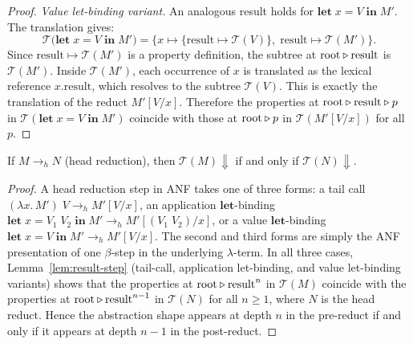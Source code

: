 \begin{proof}
  \medskip\noindent
  \emph{Value let-binding variant.}
  An analogous result holds for
  $\mathbf{let}\; x = V \;\mathbf{in}\; M'$.
  The translation gives:
  \[
    \mathcal{T}\bigl(\mathbf{let}\; x = V \;\mathbf{in}\; M'\bigr) =
    \{x \mapsto \{\mathrm{result} \mapsto \mathcal{T}(V)\},\;
    \mathrm{result} \mapsto \mathcal{T}(M')\}.
  \]
  Since $\mathrm{result} \mapsto \mathcal{T}(M')$ is a property
  definition, the subtree at
  $\text{root} \mathbin{\triangleright} \mathrm{result}$ is $\mathcal{T}(M')$.
  Inside $\mathcal{T}(M')$, each occurrence of $x$ is translated
  as the lexical reference $x.\mathrm{result}$, which resolves to
  the subtree $\mathcal{T}(V)$.
  This is exactly the translation of the reduct
  $M'[V/x]$.
  Therefore the properties at
  $\text{root} \mathbin{\triangleright} \mathrm{result} \mathbin{\triangleright} p$ in
  $\mathcal{T}(\mathbf{let}\; x = V \;\mathbf{in}\; M')$
  coincide with those at
  $\text{root} \mathbin{\triangleright} p$ in $\mathcal{T}(M'[V/x])$ for all $p$.
\end{proof}

\begin{theorem}%
  \label{thm:convergence-preservation}
  If $M \to_h N$ (head reduction), then
  $\mathcal{T}(M){\Downarrow}$ if and only if
  $\mathcal{T}(N){\Downarrow}$.
\end{theorem}

\begin{proof}
  A head reduction step in ANF takes one of three forms:
  a tail call $(\lambda x.\, M')\; V \to_h M'[V/x]$,
  an application $\mathbf{let}$-binding
  $\mathbf{let}\; x = V_1\; V_2 \;\mathbf{in}\; M'
  \to_h M'[(V_1\; V_2)/x]$,
  or a value $\mathbf{let}$-binding
  $\mathbf{let}\; x = V \;\mathbf{in}\; M'
  \to_h M'[V/x]$.
  The second and third forms are simply the ANF
  presentation of one $\beta$-step in the underlying
  $\lambda$-term.
  In all three cases, Lemma~\ref{lem:result-step}
  (tail-call, application let-binding, and value
  let-binding variants) shows that
  the properties at $\text{root} \mathbin{\triangleright} \mathrm{result}^n$ in
  $\mathcal{T}(M)$ coincide with the properties at
  $\text{root} \mathbin{\triangleright} \mathrm{result}^{n-1}$ in
  $\mathcal{T}(N)$ for all $n \ge 1$, where $N$ is the
  head reduct.
  Hence the abstraction shape appears at depth $n$ in the
  pre-reduct if and only if it appears at depth $n - 1$ in
  the post-reduct.
\end{proof}

